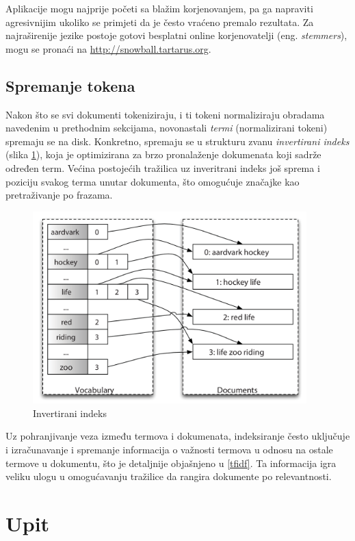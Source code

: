 \documentclass[a4paper,twoside,12pt]{memoir}
\begin{document}
Aplikacije mogu najprije početi sa blažim korjenovanjem, pa ga napraviti agresivnijim ukoliko se primjeti da je često vraćeno premalo rezultata. Za najraširenije jezike postoje gotovi besplatni online korjenovatelji (eng. \textit{stemmers}), mogu se pronaći na \url{http://snowball.tartarus.org}.

\section{Spremanje tokena}

Nakon što se svi dokumenti tokeniziraju, i ti tokeni normaliziraju obradama navedenim u prethodnim sekcijama, novonastali \textit{termi} (normalizirani tokeni) spremaju se na disk. Konkretno, spremaju se u strukturu zvanu \textit{invertirani indeks} (slika \ref{inverted_index}), koja je optimizirana za brzo pronalaženje dokumenata koji sadrže određen term. Većina postojećih tražilica uz inveritrani indeks još sprema i poziciju svakog terma unutar dokumenta, što omogućuje značajke kao pretraživanje po frazama.

\begin{figure}[H]
  \centering
  \includegraphics[width=300pt]{inverted_index}
  \caption{Invertirani indeks}
  \label{inverted_index}
\end{figure}

Uz pohranjivanje veza između termova i dokumenata, indeksiranje često uključuje i izračunavanje i spremanje informacija o važnosti termova u odnosu na ostale termove u dokumentu, što je detaljnije objašnjeno u \ref{tfidf}. Ta informacija igra veliku ulogu u omogućavanju tražilice da rangira dokumente po relevantnosti.

\chapter{Upit}
\end{document}

